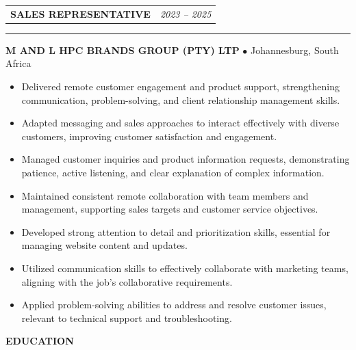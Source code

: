 \documentclass[11pt, a4paper]{article}
\newcommand{\cvsection}[1]{%
  \vspace{6pt}%
  \noindent%
  \colorbox{DKGreen}{\hspace{4pt}\rule{0pt}{14pt}\hspace{4pt}}%
  \colorbox{CardBG}{%
    \parbox[c][14pt]{\dimexpr\linewidth-16pt\relax}{%
      \hspace{8pt}\textcolor{DKGreen}{\textbf{\large\MakeUppercase{#1}}}%
    }%
  }%
  \par
  \noindent{\color{BorderClr}\rule{\linewidth}{0.6pt}}%
  \vspace{4pt}\par\noindent%
}
\begin{document}
\vspace{6pt}
\noindent
\begin{tabularx}{\linewidth}{Xr}
  \textcolor{DarkTxt}{\textbf{\large SALES REPRESENTATIVE}} &
  \textcolor{LiteTxt}{\textit{2023 -- 2025}} \\
\end{tabularx}%
{\color{DKGreen}\rule{\linewidth}{0.8pt}}%
\vspace{2pt}
\noindent\textcolor{MDGreen}{\textbf{M AND L HPC BRANDS GROUP (PTY) LTP}}\;
\textcolor{LiteTxt}{$\bullet$\; Johannesburg, South Africa}
\vspace{3pt}
\begin{itemize}
  \item \textcolor{MidTxt}{Delivered remote customer engagement and product support, strengthening communication, problem-solving, and client relationship management skills.}
  \item \textcolor{MidTxt}{Adapted messaging and sales approaches to interact effectively with diverse customers, improving customer satisfaction and engagement.}
  \item \textcolor{MidTxt}{Managed customer inquiries and product information requests, demonstrating patience, active listening, and clear explanation of complex information.}
  \item \textcolor{MidTxt}{Maintained consistent remote collaboration with team members and management, supporting sales targets and customer service objectives.}
  \item \textcolor{MidTxt}{Developed strong attention to detail and prioritization skills, essential for managing website content and updates.}
  \item \textcolor{MidTxt}{Utilized communication skills to effectively collaborate with marketing teams, aligning with the job's collaborative requirements.}
  \item \textcolor{MidTxt}{Applied problem-solving abilities to address and resolve customer issues, relevant to technical support and troubleshooting.}
\end{itemize}
\vspace{2pt}

\cvsection{Education}
\end{document}
